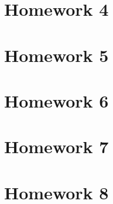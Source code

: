 \documentclass[12pt]{article}
\begin{document}
\newpage

\section{Homework 4}



\newpage

\section{Homework 5}



\newpage

\section{Homework 6}


\newpage

\section{Homework 7}



\newpage

\section{Homework 8}



\end{document}
